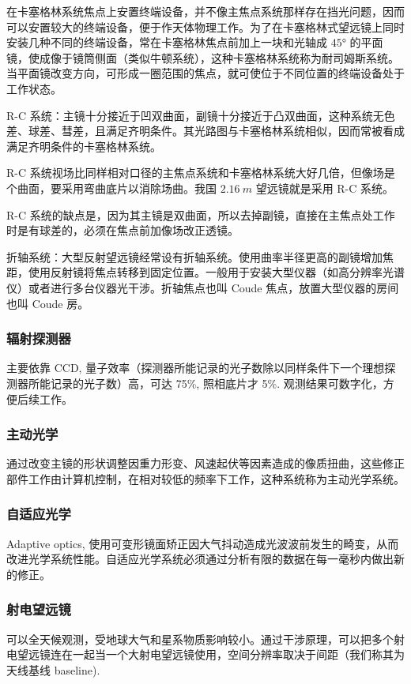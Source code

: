 \documentclass[UTF8, 12pt, a4paper, oneside, onecolumn, fontset=none]{ctexart}
\begin{document}
在卡塞格林系统焦点上安置终端设备，并不像主焦点系统那样存在挡光问题，因而可以安置较大的终端设备，便于作天体物理工作。为了在卡塞格林式望远镜上同时安装几种不同的终端设备，常在卡塞格林焦点前加上一块和光轴成 $\ang{45;;}$ 的平面镜，使成像于镜筒侧面（类似牛顿系统），这种卡塞格林系统称为耐司姆斯系统。当平面镜改变方向，可形成一圈范围的焦点，就可使位于不同位置的终端设备处于工作状态。

R-C 系统：主镜十分接近于凹双曲面，副镜十分接近于凸双曲面，这种系统无色差、球差、彗差，且满足齐明条件。其光路图与卡塞格林系统相似，因而常被看成满足齐明条件的卡塞格林系统。

R-C 系统视场比同样相对口径的主焦点系统和卡塞格林系统大好几倍，但像场是个曲面，要采用弯曲底片以消除场曲。我国 $\qty{2.16}{m}$ 望远镜就是采用 R-C 系统。

R-C 系统的缺点是，因为其主镜是双曲面，所以去掉副镜，直接在主焦点处工作时是有球差的，必须在焦点前加像场改正透镜。

折轴系统：大型反射望远镜经常设有折轴系统。使用曲率半径更高的副镜增加焦距，使用反射镜将焦点转移到固定位置。一般用于安装大型仪器（如高分辨率光谱仪）或者进行多台仪器光干涉。折轴焦点也叫 Coude 焦点，放置大型仪器的房间也叫 Coude 房。

\subsubsection{辐射探测器}
主要依靠 CCD, 量子效率（探测器所能记录的光子数除以同样条件下一个理想探测器所能记录的光子数）高，可达 75\%, 照相底片才 5\%. 观测结果可数字化，方便后续工作。

\subsubsection{主动光学}
通过改变主镜的形状调整因重力形变、风速起伏等因素造成的像质扭曲，这些修正部件工作由计算机控制，在相对较低的频率下工作，这种系统称为主动光学系统。

\subsubsection{自适应光学}
Adaptive optics, 使用可变形镜面矫正因大气抖动造成光波波前发生的畸变，从而改进光学系统性能。自适应光学系统必须通过分析有限的数据在每一毫秒内做出新的修正。

\subsubsection{射电望远镜}
可以全天候观测，受地球大气和星系物质影响较小。通过干涉原理，可以把多个射电望远镜连在一起当一个大射电望远镜使用，空间分辨率取决于间距（我们称其为天线基线 baseline).
\end{document}
